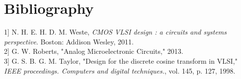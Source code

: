 \documentclass[10pt,journal]{IEEEtran}
\begin{document}
\section{Bibliography}
	\indent {[}1{]} N. H. E. H. D. M. Weste, \textit{CMOS VLSI design : a circuits and systems perspective}. Boston: Addison Wesley, 2011. \\
	\indent {[}2{]} G. W. Roberts, "Analog Microelectronic Circuits," 2013. \\
	\indent {[}3{]} G. S. B. G. M. Taylor, "Design for the discrete cosine transform in VLSI," \textit{IEEE proceedings. Computers and digital techniques.}, vol. 145, p. 127, 1998.
\end{document}
